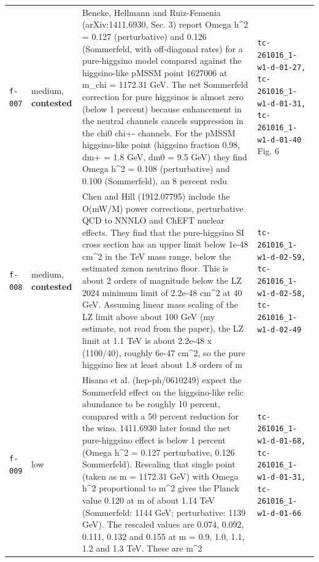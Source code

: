 \documentclass[11pt,a4paper]{article}
\begin{document}
\begin{longtable}{@{}p{}p{}p{}p{}@{}}
\texttt{f-007} & medium, \textbf{contested} & Beneke, Hellmann and Ruiz-Femenia (arXiv:1411.6930, Sec. 3) report Omega h\textasciicircum{}2 = 0.127 (perturbative) and 0.126 (Sommerfeld, with off-diagonal rates) for a pure-higgsino model compared against the higgsino-like pMSSM point 1627006 at m\_chi = 1172.31 GeV. The net Sommerfeld correction for pure higgsinos is almost zero (below 1 percent) because enhancement in the neutral channels cancels suppression in the chi0 chi+- channels. For the pMSSM higgsino-like point (higgsino fraction 0.98, dm+ = 1.8 GeV, dm0 = 9.5 GeV) they find Omega h\textasciicircum{}2 = 0.108 (perturbative) and 0.100 (Sommerfeld), an 8 percent redu & \texttt{tc-261016\_\allowbreak{}1-w1-d-01-27,\allowbreak{} tc-261016\_\allowbreak{}1-w1-d-01-31,\allowbreak{} tc-261016\_\allowbreak{}1-w1-d-01-40} Fig. 6 \\
\texttt{f-008} & medium, \textbf{contested} & Chen and Hill (1912.07795) include the O(mW/M) power corrections, perturbative QCD to NNNLO and ChEFT nuclear effects. They find that the pure-higgsino SI cross section has an upper limit below 1e-48 cm\textasciicircum{}2 in the TeV mass range, below the estimated xenon neutrino floor. This is about 2 orders of magnitude below the LZ 2024 minimum limit of 2.2e-48 cm\textasciicircum{}2 at 40 GeV. Assuming linear mass scaling of the LZ limit above about 100 GeV (my estimate, not read from the paper), the LZ limit at 1.1 TeV is about 2.2e-48 x (1100/40), roughly 6e-47 cm\textasciicircum{}2, so the pure higgsino lies at least about 1.8 orders of m & \texttt{tc-261016\_\allowbreak{}1-w1-d-02-59,\allowbreak{} tc-261016\_\allowbreak{}1-w1-d-02-58,\allowbreak{} tc-261016\_\allowbreak{}1-w1-d-02-49} \\
\texttt{f-009} & low & Hisano et al. (hep-ph/0610249) expect the Sommerfeld effect on the higgsino-like relic abundance to be roughly 10 percent, compared with a 50 percent reduction for the wino. 1411.6930 later found the net pure-higgsino effect is below 1 percent (Omega h\textasciicircum{}2 = 0.127 perturbative, 0.126 Sommerfeld). Rescaling that single point (taken as m = 1172.31 GeV) with Omega h\textasciicircum{}2 proportional to m\textasciicircum{}2 gives the Planck value 0.120 at m of about 1.14 TeV (Sommerfeld: 1144 GeV; perturbative: 1139 GeV). The rescaled values are 0.074, 0.092, 0.111, 0.132 and 0.155 at m = 0.9, 1.0, 1.1, 1.2 and 1.3 TeV. These are m\textasciicircum{}2  & \texttt{tc-261016\_\allowbreak{}1-w1-d-01-68,\allowbreak{} tc-261016\_\allowbreak{}1-w1-d-01-31,\allowbreak{} tc-261016\_\allowbreak{}1-w1-d-01-66} \\

\end{longtable}
\end{document}
